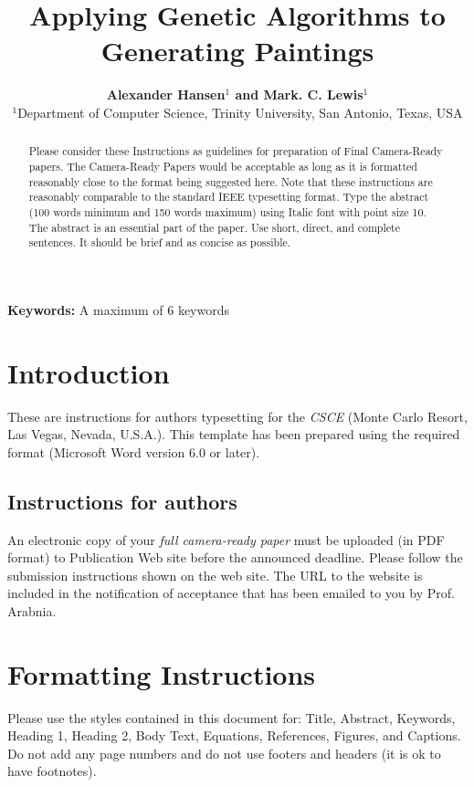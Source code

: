 \documentclass[conference]{csce}
\title{\bf Applying Genetic Algorithms to Generating Paintings}           %
\author{
{\bfseries Alexander Hansen$^1$ and  Mark. C. Lewis$^1$}\\
$^1$Department of Computer Science, Trinity University, San Antonio, Texas, USA\\
}
\begin{document}
\maketitle                        %


\begin{abstract}%
Please consider these Instructions as guidelines for preparation of 
Final Camera-Ready papers. The Camera-Ready Papers would be acceptable as 
long as it is formatted reasonably close to the format being suggested here. 
Note that these instructions are reasonably comparable to the standard IEEE 
typesetting format. Type the abstract (100 words minimum and 150 words maximum) 
using Italic font with point size 10. The abstract is an essential part of the 
paper. Use short, direct, and complete sentences. It should be brief and as concise as possible.
\end{abstract}


\vspace{1em}
\noindent\textbf{Keywords:}
 {\small  A maximum of 6 keywords} %



\section{Introduction}
These are instructions for authors typesetting for the {\em CSCE} 
(Monte Carlo Resort, Las Vegas, Nevada, U.S.A.). This 
template has been prepared using the required format (Microsoft Word version 6.0 or later). 

\subsection{Instructions for authors}
An electronic copy of your {\em full camera-ready paper} must be uploaded (in PDF format) 
to Publication Web site before the announced deadline. Please follow the submission 
instructions shown on the web site. The URL to the website is included in the 
notification of acceptance that has been emailed to you by Prof. Arabnia.

\section{Formatting Instructions}
Please use the styles contained in this document for: Title, Abstract, Keywords, 
Heading 1, Heading 2, Body Text, Equations, References, Figures, and Captions. 
Do not add any page numbers and do not use footers and headers (it is ok to have footnotes).
\end{document}
